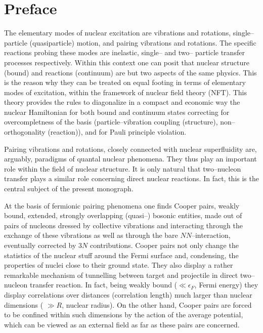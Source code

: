 
 \chapter*{Preface}
The elementary modes of nuclear excitation are vibrations and rotations, single--particle (quasiparticle)  motion, and pairing vibrations and rotations. The specific reactions probing these modes are inelastic,  single-- and two-- particle transfer processes respectively. Within this context one can posit that nuclear structure (bound) and reactions (continuum) are but two aspects of the same physics. This is the reason why they can be treated on equal footing in terms of elementary modes of excitation, within the framework of nuclear field theory (NFT). This theory provides the rules to diagonalize in a compact and economic way the nuclear Hamiltonian for both bound and continuum states correcting for overcompletness of the basis (particle--vibration coupling (structure), non--orthogonality (reaction)), and for Pauli principle violation. 

Pairing vibrations and rotations, closely connected with nuclear superfluidity are, arguably,  paradigms of quantal nuclear phenomena. They thus play an important  role within the field of nuclear structure. It is only natural that two--nucleon transfer plays a similar role concerning direct nuclear reactions. In fact, this is the central subject of the present monograph.


At the basis of fermionic pairing phenomena one finds Cooper pairs, weakly bound, extended, strongly overlapping (quasi--) bosonic entities, made out of pairs of nucleons dressed by collective vibrations and interacting through the exchange of these vibrations as well as through the bare $NN$--interaction, eventually corrected by $3N$ contributions.
Cooper pairs not only change the statistics of the nuclear stuff around the Fermi surface and, condensing, the properties of nuclei close to their ground state. They also display a rather remarkable mechanism of tunnelling between  target and projectile in  direct two--nucleon transfer reaction. In fact, being weakly bound ($\ll \epsilon_F$, Fermi energy) they display correlations over distances (correlation length) much larger than nuclear dimensions ( $\gg R$, nuclear radius). On the other hand, Cooper pairs are forced to be confined within such dimensions by the action of the average potential, which can be viewed as an external field as far as these pairs are concerned.



